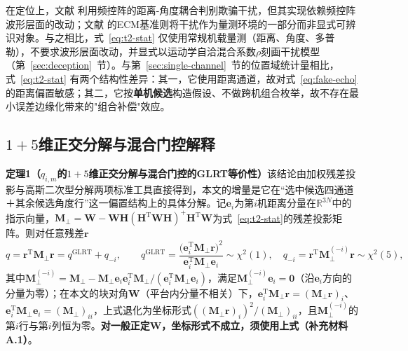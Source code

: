 \documentclass[UTF8,a4paper,zihao=-4]{ctexart}
\begin{document}
在定位上，文献\cite{zhangfda2017} 利用频控阵的距离-角度耦合判别欺骗干扰，但其实现依赖频控阵波形层面的改动；文献\cite{blair1998} 的ECM基准则将干扰作为量测环境的一部分而非显式可辨识对象。与之相比，式~\eqref{eq:t2-stat} 仅使用常规机载量测（距离、角度、多普勒），不要求波形层面改动，并显式以运动学自洽混合系数\(\rho\)刻画干扰模型（第~\ref{sec:deception}~节）。与第~\ref{sec:single-channel}~节的位置域统计量相比，式~\eqref{eq:t2-stat} 有两个结构性差异：其一，它使用距离通道，故对式~\eqref{eq:fake-echo} 的距离偏置敏感；其二，它按\textbf{单机候选}构造假设、不做跨机组合枚举，故不存在最小误差边缘化带来的"组合补偿"效应。



\subsection{\(1+5\)维正交分解与混合门控解释}\label{sec:decomposition}
\textbf{定理1（\(q_{i,m}\)的\(1+5\)维正交分解与混合门控的GLRT等价性）}\quad 该结论由加权残差投影与高斯二次型分解两项标准工具直接得到，本文的增量是它在“选中候选四通道＋其余候选角度行”这一偏置结构上的具体分解。记\(\boldsymbol e_i\)为第\(i\)机距离分量在\(\mathbb R^{3N}\)中的指示向量，\(\boldsymbol M_{\perp}=\boldsymbol W-\boldsymbol W\boldsymbol H(\boldsymbol H^{\mathrm T}\boldsymbol W\boldsymbol H)^{+}\boldsymbol H^{\mathrm T}\boldsymbol W\)为式~\eqref{eq:t2-stat}的残差投影矩阵。则对任意残差\(\boldsymbol r\)
\begin{equation}
q=\boldsymbol r^{\mathrm T}\boldsymbol M_{\perp}\boldsymbol r
=q^{\mathrm{GLRT}}+q_{-i},\qquad
q^{\mathrm{GLRT}}=\frac{\bigl(\boldsymbol e_i^{\mathrm T}\boldsymbol M_{\perp}\boldsymbol r\bigr)^2}{\boldsymbol e_i^{\mathrm T}\boldsymbol M_{\perp}\boldsymbol e_i}\sim\chi^2(1),\quad
q_{-i}=\boldsymbol r^{\mathrm T}\boldsymbol M_{\perp}^{(-i)}\boldsymbol r\sim\chi^2(5),
\label{eq:thm1-decomp}
\end{equation}
其中\(\boldsymbol M_{\perp}^{(-i)}=\boldsymbol M_{\perp}-\boldsymbol M_{\perp}\boldsymbol e_i\boldsymbol e_i^{\mathrm T}\boldsymbol M_{\perp}/(\boldsymbol e_i^{\mathrm T}\boldsymbol M_{\perp}\boldsymbol e_i)\)，满足\(\boldsymbol M_{\perp}^{(-i)}\boldsymbol e_i=\boldsymbol 0\)（沿\(\boldsymbol e_i\)方向的分量为零）；在本文的块对角\(\boldsymbol W\)（平台内分量不相关）下，\(\boldsymbol e_i^{\mathrm T}\boldsymbol M_{\perp}\boldsymbol r=(\boldsymbol M_{\perp}\boldsymbol r)_i\)、\(\boldsymbol e_i^{\mathrm T}\boldsymbol M_{\perp}\boldsymbol e_i=(\boldsymbol M_{\perp})_{ii}\)，上式退化为坐标形式\(((\boldsymbol M_{\perp}\boldsymbol r)_i)^2/(\boldsymbol M_{\perp})_{ii}\)，且\(\boldsymbol M_{\perp}^{(-i)}\)的第\(i\)行与第\(i\)列恒为零。\textbf{对一般正定\(\boldsymbol W\)，坐标形式不成立，须使用上式（补充材料A.1）}。
\end{document}
